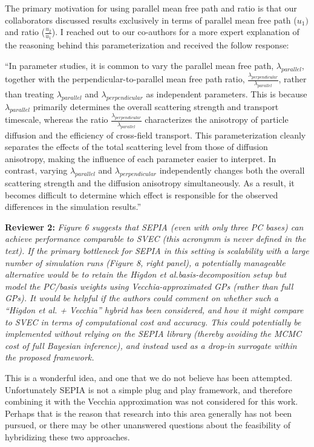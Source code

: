 \documentclass[12pt]{article}
\begin{document}
\bigskip
\noindent
The primary motivation for using parallel mean free path and ratio is that our
collaborators discussed results exclusively in terms of parallel mean free
path ($u_1)$ and ratio ($\frac{u_2}{u_1}$). I reached out to our co-authors
for a more expert explanation of the reasoning behind this parameterization
and received the follow response:

\bigskip
\noindent
``In parameter studies, it is common to vary the parallel mean free path,
$\lambda_{parallel}$, together with the perpendicular-to-parallel mean free
path ratio, $\frac{\lambda_{perpendicular}}{\lambda_{parallel}}$, rather than
treating $\lambda_{parallel}$ and $\lambda_{perpendicular}$ as independent
parameters. This is because $\lambda_{parallel}$ primarily determines the
overall scattering strength and transport timescale, whereas the ratio
$\frac{\lambda_{perpendicular}}{\lambda_{parallel}}$ characterizes the
anisotropy of particle diffusion and the efficiency of cross-field transport.
This parameterization cleanly separates the effects of the total scattering
level from those of diffusion anisotropy, making the influence of each
parameter easier to interpret. In contrast, varying $\lambda_{parallel}$ and
$\lambda_{perpendicular}$ independently changes both the overall scattering
strength and the diffusion anisotropy simultaneously. As a result, it becomes
difficult to determine which effect is responsible for the observed
differences in the simulation results.''

\bigskip
\noindent
\textbf{Reviewer 2:} \textit{Figure 6 suggests that SEPIA (even with only
three PC bases) can achieve performance comparable to SVEC (this acronymm is
never defined in the text). If the primary bottleneck for SEPIA in this
setting is scalability with a large number of simulation runs (Figure 8,
right panel), a potentially manageable alternative would be to retain the
Higdon et al.basis-decomposition setup but model the PC/basis weights using
Vecchia-approximated GPs (rather than full GPs). It would be helpful if the
authors could comment on whether such a ``Higdon et al. + Vecchia'' hybrid has
been considered, and how it might compare to SVEC in terms of computational
cost and accuracy. This could potentially be implemented without relying on
the SEPIA library (thereby avoiding the MCMC cost of full Bayesian inference),
and instead used as a drop-in surrogate within the proposed framework.}

\bigskip
\noindent
This is a wonderful idea, and one that we do not believe has been attempted.
Unfortunately SEPIA is not a simple plug and play framework, and therefore
combining it with the Vecchia approximation was not considered for this work.
Perhaps that is the reason that research into this area generally has not been
pursued, or there may be other unanswered questions about the feasibility of
hybridizing these two approaches.
\end{document}

